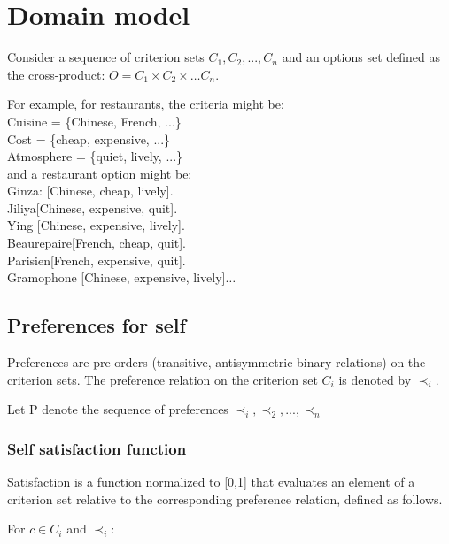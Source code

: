 \documentclass{article}
\begin{document}
		\title{\vskip -10pt}
		
		\author{Lydia Ould Ouali, Charles Rich \and
		Nicolas Sabouret }
		
	
	\section{Domain model}
		Consider a sequence of criterion sets $C_1, C_2, ..., C_n$ and an options set defined as the cross-product:
				$O = C_1 \times C_2 \times \ldots C_n$.
		
		For example, for restaurants, the criteria might be: \\
			Cuisine = \{Chinese, French, ...\} \\
			Cost = \{cheap, expensive, ...\} \\
			Atmosphere = \{quiet, lively, ...\} \\ 
		
		and a restaurant option might be: \\
		 Ginza: [Chinese, cheap, lively].  \\ Jiliya[Chinese, expensive, quit].   \\ Ying [Chinese, expensive, lively].\\Beaurepaire[French, cheap, quit].  \\ Parisien[French, expensive, quit].   \\ Gramophone [Chinese, expensive, lively]$\ldots$ \\ 
		 
	
	\subsection{Preferences for self}
	Preferences are pre-orders (transitive, antisymmetric binary
	relations) on the criterion sets.  The preference relation on the
	criterion set $C_i$ is denoted by $\prec_i$.
	
	Let P denote the sequence of preferences $ \prec_i, \prec_2, ..., \prec_n$
	
		\subsubsection{	Self satisfaction function} 
	
	Satisfaction is a function normalized to [0,1] that evaluates an element of a criterion set relative to the corresponding preference relation, defined as follows.
	
		For $c \in C_i$ and $\prec_i$:
	
\end{document}
